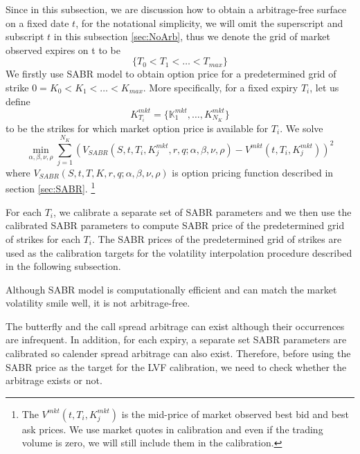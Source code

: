 \documentclass[letterpaper,12pt,titlepage,oneside,final]{book}
\numberwithin{equation}{section}
\theoremstyle{definition}
\newcommand{\Vmkt}{V^{mkt}}
\begin{document}
Since in this subsection, we are discussion how to obtain a arbitrage-free surface on a fixed date $t$, for the notational simplicity, we will omit the superscript  and subscript $t$ in this subsection \ref{sec:NoArb}, thus we denote the grid of market observed expires on t to be \[
\{ T_{0}<
T_1 < \dots< T_{max}
\}
\]
We firstly use SABR model to obtain option price for a predetermined grid of strike $0=K_0<K_1<\dots<K_{max}$.  More specifically, for a fixed expiry $T_i$, let us define 
\[K^{mkt}_{T_i}=
\{
	\mathbb{K}^{mkt}_{1},\dots,K^{mkt}_{N_K}
\}
\] 
to be the strikes for which market option price is available for $T_i$.
We solve
\[
\min_{\alpha,\beta,\nu,\rho} \sum_{j=1}^{N_K} \left(V_{SABR}(S,t,T_i,K^{mkt}_j,r,q;\alpha,\beta,\nu,\rho)-\Vmkt(t,T_i,K^{mkt}_j)\right)^2
\]
where $V_{SABR}(S,t,T,K,r,q;\alpha,\beta,\nu,\rho)$ is option pricing function described in section \ref{sec:SABR}. \footnote{The $\Vmkt(t,T_i,K^{mkt}_j)$ is the mid-price of market observed best bid and  best ask prices. We use market quotes in calibration and even if the trading volume is zero, we will still include them in the calibration.}

For each $T_i$, we calibrate a separate set of SABR parameters and we then use the calibrated SABR parameters to compute SABR price of the predetermined grid of strikes for each $T_i$.  The SABR prices of the predetermined grid of strikes are used as the calibration targets for the volatility interpolation procedure described in the following subsection.

Although SABR model is computationally efficient and can match the market volatility smile well, it is not arbitrage-free.  

The butterfly and the call spread arbitrage can exist although their occurrences are infrequent. In addition,  for each expiry, a separate set SABR parameters are calibrated so calender spread arbitrage can also exist. Therefore, before using the SABR price as the target for the LVF  calibration, we need to check whether the arbitrage  exists or not. 
\end{document}
